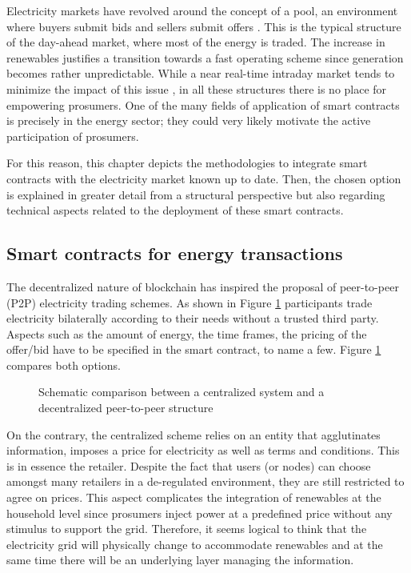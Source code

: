 Electricity markets have revolved around the concept of a pool, an environment where buyers submit bids and sellers submit offers \cite{onaiwu2009does}. This is the typical structure of the day-ahead market, where most of the energy is traded. The increase in renewables justifies a transition towards a fast operating scheme since generation becomes rather unpredictable. While a near real-time intraday market tends to minimize the impact of this issue \cite{chaves2015spanish}, in all these structures there is no place for empowering prosumers. One of the many fields of application of smart contracts is precisely in the energy sector; they could very likely motivate the active participation of prosumers. 

For this reason, this chapter depicts the methodologies to integrate smart contracts with the electricity market known up to date. Then, the chosen option is explained in greater detail from a structural perspective but also regarding technical aspects related to the deployment of these smart contracts. 

\subsection{Smart contracts for energy transactions} %
The decentralized nature of blockchain has inspired the proposal of peer-to-peer (P2P) electricity trading schemes. As shown in Figure \ref{fig:central1} participants trade electricity bilaterally according to their needs without a trusted third party. Aspects such as the amount of energy, the time frames, the pricing of the offer/bid have to be specified in the smart contract, to name a few. Figure \ref{fig:central1} compares both options.

\begin{figure}[!htb]\centering
    \caption{Schematic comparison between a centralized system and a decentralized peer-to-peer structure}
    \label{fig:central1}
\end{figure}
On the contrary, the centralized scheme relies on an entity that agglutinates information, imposes a price for electricity as well as terms and conditions. This is in essence the retailer. Despite the fact that users (or nodes) can choose amongst many retailers in a de-regulated environment, they are still restricted to agree on prices. This aspect complicates the integration of renewables at the household level since prosumers inject power at a predefined price without any stimulus to support the grid. Therefore, it seems logical to think that the electricity grid will physically change to accommodate renewables and at the same time there will be an underlying layer managing the information. 

